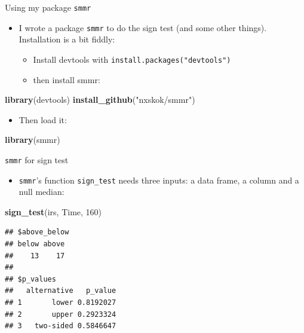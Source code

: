 \documentclass[
  ignorenonframetext,
]{beamer}
\newenvironment{Shaded}{\begin{snugshade}}{\end{snugshade}}
\newcommand{\DecValTok}[1]{\textcolor[rgb]{0.00,0.00,0.81}{#1}}
\newcommand{\KeywordTok}[1]{\textcolor[rgb]{0.13,0.29,0.53}{\textbf{#1}}}
\newcommand{\NormalTok}[1]{#1}
\newcommand{\StringTok}[1]{\textcolor[rgb]{0.31,0.60,0.02}{#1}}
\providecommand{\tightlist}{%
  \setlength{\itemsep}{0pt}\setlength{\parskip}{0pt}}
\begin{document}
\begin{frame}[fragile]{Using my package \texttt{smmr}}
\protect\hypertarget{using-my-package-smmr}{}

\begin{itemize}
\tightlist
\item
  I wrote a package \texttt{smmr} to do the sign test (and some other
  things). Installation is a bit fiddly:

  \begin{itemize}
  \tightlist
  \item
    Install devtools with \texttt{install.packages("devtools")}
  \item
    then install smmr:
  \end{itemize}
\end{itemize}

\begin{Shaded}
\begin{Highlighting}[]
\KeywordTok{library}\NormalTok{(devtools)}
\KeywordTok{install_github}\NormalTok{(}\StringTok{"nxskok/smmr"}\NormalTok{)}
\end{Highlighting}
\end{Shaded}

\begin{itemize}
\tightlist
\item
  Then load it:
\end{itemize}

\begin{Shaded}
\begin{Highlighting}[]
\KeywordTok{library}\NormalTok{(smmr)}
\end{Highlighting}
\end{Shaded}

\end{frame}

\begin{frame}[fragile]{\texttt{smmr} for sign test}
\protect\hypertarget{smmr-for-sign-test}{}

\begin{itemize}
\tightlist
\item
  \texttt{smmr}'s function \texttt{sign\_test} needs three inputs: a
  data frame, a column and a null median:
\end{itemize}

\begin{Shaded}
\begin{Highlighting}[]
\KeywordTok{sign_test}\NormalTok{(irs, Time, }\DecValTok{160}\NormalTok{)}
\end{Highlighting}
\end{Shaded}

\begin{verbatim}
## $above_below
## below above 
##    13    17 
## 
## $p_values
##   alternative   p_value
## 1       lower 0.8192027
## 2       upper 0.2923324
## 3   two-sided 0.5846647
\end{verbatim}

\end{frame}
\end{document}
